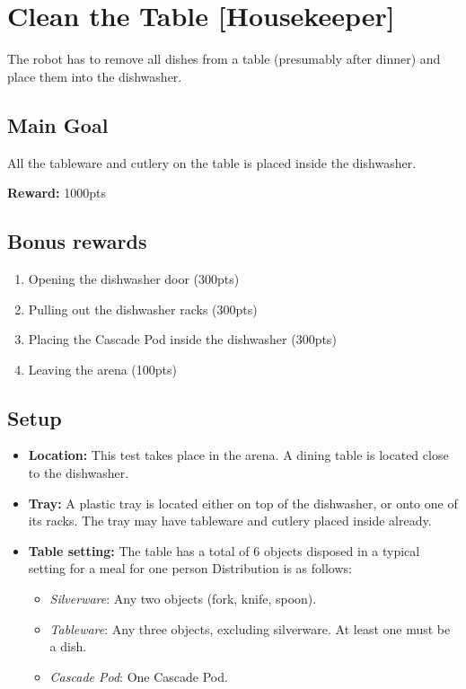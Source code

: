 \section{Clean the Table [Housekeeper]}
\label{test:clean-the-table}
The robot has to remove all dishes from a table (presumably after dinner) and place them into the dishwasher.


\subsection*{Main Goal}
All the tableware and cutlery on the table is placed inside the dishwasher.

\noindent\textbf{Reward:} 1000pts

\subsection*{Bonus rewards}
\begin{enumerate}[nosep]
	\item Opening the dishwasher door (300pts)
	\item Pulling out the dishwasher racks (300pts)
	\item Placing the Cascade Pod inside the dishwasher (300pts)
	\item Leaving the arena (100pts)
\end{enumerate}

\subsection*{Setup}
\begin{itemize}[nosep]
	\item \textbf{Location:} This test takes place in the arena. A dining table is located close to the dishwasher.
	\item \textbf{Tray:} A plastic tray is located either on top of the dishwasher, or onto one of its racks. The tray may have tableware and cutlery placed inside already.
	\item \textbf{Table setting:} The table has a total of 6 objects disposed in a typical setting for a meal for one person
	Distribution is as follows:
	\begin{itemize}[nosep]
		\item\textit{Silverware}: Any two objects (fork, knife, spoon).
		\item\textit{Tableware}: Any three objects, excluding silverware. At least one must be a dish.
		\item\textit{Cascade Pod}: One Cascade Pod.
	\end{itemize}
\end{itemize}


